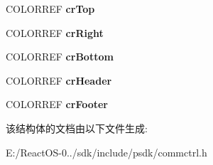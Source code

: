 \begin{DoxyCompactItemize}
C\+O\+L\+O\+R\+R\+EF {\bfseries cr\+Top}
\item 
\mbox{\label{structtag_l_v_g_r_o_u_p_m_e_t_r_i_c_s_a9c08941b8a297f936e507c289acde115}} 
C\+O\+L\+O\+R\+R\+EF {\bfseries cr\+Right}
\item 
\mbox{\label{structtag_l_v_g_r_o_u_p_m_e_t_r_i_c_s_a93d9e5854a72f17848696c3ab2b39bc3}} 
C\+O\+L\+O\+R\+R\+EF {\bfseries cr\+Bottom}
\item 
\mbox{\label{structtag_l_v_g_r_o_u_p_m_e_t_r_i_c_s_a30c108c78949ce82a3da59f9b14dbc09}} 
C\+O\+L\+O\+R\+R\+EF {\bfseries cr\+Header}
\item 
\mbox{\label{structtag_l_v_g_r_o_u_p_m_e_t_r_i_c_s_a785f777a3213412702a3a290cc34d905}} 
C\+O\+L\+O\+R\+R\+EF {\bfseries cr\+Footer}
\end{DoxyCompactItemize}


该结构体的文档由以下文件生成\+:\begin{DoxyCompactItemize}
\item 
E\+:/\+React\+O\+S-\/0../sdk/include/psdk/commctrl.\+h\end{DoxyCompactItemize}
